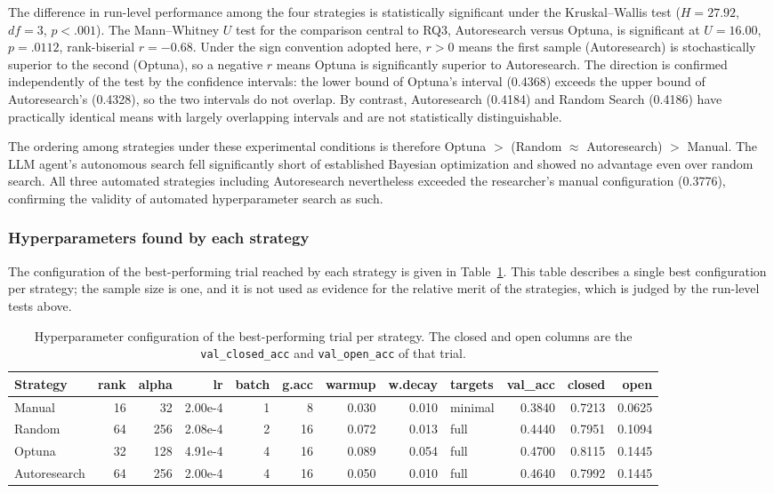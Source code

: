 The difference in run-level performance among the four strategies is
statistically significant under the Kruskal--Wallis test ($H = 27.92$, $df = 3$,
$p < .001$). The Mann--Whitney $U$ test for the comparison central to RQ3,
Autoresearch versus Optuna, is significant at $U = 16.00$, $p = .0112$,
rank-biserial $r = -0.68$. Under the sign convention adopted here, $r > 0$ means
the first sample (Autoresearch) is stochastically superior to the second
(Optuna), so a negative $r$ means Optuna is significantly superior to
Autoresearch. The direction is confirmed independently of the test by the
confidence intervals: the lower bound of Optuna's interval (0.4368) exceeds the
upper bound of Autoresearch's (0.4328), so the two intervals do not overlap. By
contrast, Autoresearch (0.4184) and Random Search (0.4186) have practically
identical means with largely overlapping intervals and are not statistically
distinguishable.

The ordering among strategies under these experimental conditions is therefore
Optuna $>$ (Random $\approx$ Autoresearch) $>$ Manual. The LLM agent's autonomous
search fell significantly short of established Bayesian optimization and showed
no advantage even over random search. All three automated strategies including
Autoresearch nevertheless exceeded the researcher's manual configuration
(0.3776), confirming the validity of automated hyperparameter search as such.

\subsubsection{Hyperparameters found by each strategy}

The configuration of the best-performing trial reached by each strategy is given
in Table~\ref{tab:phase3best}. This table describes a single best configuration
per strategy; the sample size is one, and it is not used as evidence for the
relative merit of the strategies, which is judged by the run-level tests above.

\begin{table}[t]
\centering
\caption{Hyperparameter configuration of the best-performing trial per strategy.
The closed and open columns are the \texttt{val\_closed\_acc} and
\texttt{val\_open\_acc} of that trial.}
\label{tab:phase3best}
\footnotesize
\begin{tabular}{@{}lrrrrrrrlrrr@{}}
\toprule
Strategy & rank & alpha & lr & batch & g.acc & warmup & w.decay & targets & val\_acc & closed & open \\
\midrule
Manual       & 16 & 32  & 2.00e-4 & 1 & 8  & 0.030 & 0.010 & minimal & 0.3840 & 0.7213 & 0.0625 \\
Random       & 64 & 256 & 2.08e-4 & 2 & 16 & 0.072 & 0.013 & full    & 0.4440 & 0.7951 & 0.1094 \\
Optuna       & 32 & 128 & 4.91e-4 & 4 & 16 & 0.089 & 0.054 & full    & 0.4700 & 0.8115 & 0.1445 \\
Autoresearch & 64 & 256 & 2.00e-4 & 4 & 16 & 0.050 & 0.010 & full    & 0.4640 & 0.7992 & 0.1445 \\
\bottomrule
\end{tabular}
\end{table}

